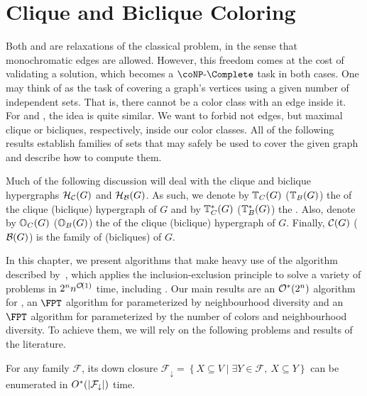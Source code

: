 \section{Clique and Biclique Coloring}

Both  and  are relaxations of the classical  problem, in the sense that monochromatic edges are allowed.
However, this freedom comes at the cost of validating a solution, which becomes a $\coNP\text{-}\Complete$ task in both cases.
One may think of  as the task of covering a graph's vertices using a given number of independent sets.
That is, there cannot be a color class with an edge inside it.
For  and , the idea is quite similar.
We want to forbid not edges, but maximal clique or bicliques, respectively, inside our color classes.
All of the following results establish families of sets that may safely be used to cover the given graph and describe how to compute them.

Much of the following discussion will deal with the clique and biclique hypergraphs $\mathcal{H}_{\mathcal{C}}(G)$ and $\mathcal{H}_{\mathcal{B}}(G)$.
As such, we denote by $\mathbb{T}_{C}(G)$ ($\mathbb{T}_{B}(G)$) the  of the clique (biclique) hypergraph of $G$ and by $\mathbb{T}^*_{C}(G)$ ($\mathbb{T}^*_{B}(G)$) the .
Also, denote by $\mathbb{O}_{C}(G)$ ($\mathbb{O}_{B}(G)$) the  of the clique (biclique) hypergraph of $G$.
Finally, $\mathcal{C}(G)$ ($\mathcal{B}(G)$) is the family of  (bicliques) of $G$.

In this chapter, we present algorithms that make heavy use of the algorithm described by~\cite{inclusion_exclusion}, which applies the inclusion-exclusion principle to solve a variety of problems in $2^nn^{\mathcal{O}\!\left(1\right)}$ time, including .
Our main results are an $\mathcal{O}^*\!\left(2^n\right)$ algorithm for , an $\FPT$ algorithm for  parameterized by neighbourhood diversity and an $\FPT$ algorithm for  parameterized by the number of colors and neighbourhood diversity.
To achieve them, we will rely on the following problems and results of the literature.

\begin{lemma}
    \label{lem:down_closure}
    For any family $\mathcal{F}$, its down closure $\mathcal{F}_{\downarrow} = \left\{X \subseteq V \mid \exists Y \in \mathcal{F},\ X \subseteq Y\right\}$ can be enumerated in $O^*(|\mathcal{F}_{\downarrow}|)$ time.
\end{lemma}

